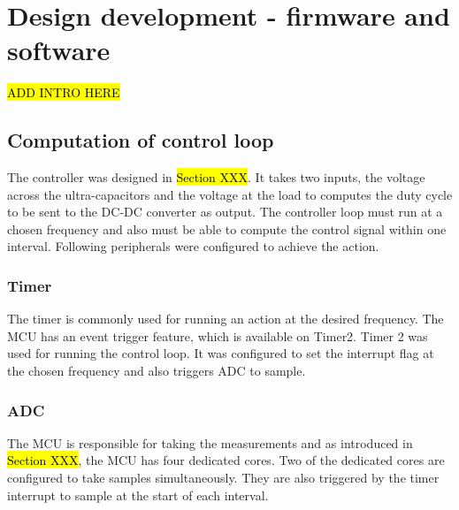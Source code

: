 \section{Design development - firmware and software}
\begin{comment}
     modules required on microcontroller for product to satisfy objectives of Section~\ref{sec:objectives}
    \begin{itemize}
        \item timer module for guaranteed execution of control loop regime at \hl{desired} frequency
        \item module to handle reading and processing of DC-DC converter circuit voltages
        \item timer module for microcontroller to transmit to user interface
        \item communication module for microcontroller to receive from user interface
    \end{itemize}
    \hl{in implementation section explain timer modules in detail (frequency, configuration etc.) (timer.c); explain UART.c; explain ADC.c; explain PWM.c; explain main.c}   
\end{comment}

\hl{ADD INTRO HERE}

\subsection{Computation of control loop}
The controller was designed in \hl{Section XXX}. It takes two inputs, the voltage across the ultra-capacitors and the voltage at the load to computes the duty cycle to be sent to the DC-DC converter as output. The controller loop must run at a chosen frequency and also must be able to compute the control signal within one interval. Following peripherals were configured to achieve the action. 

\subsubsection{Timer}
The timer is commonly used for running an action at the desired frequency. The MCU has an event trigger feature, which is available on Timer2. Timer 2 was used for running the control loop. It was configured to set the interrupt flag at the chosen frequency and also triggers ADC to sample. 

\subsubsection{ADC}
The MCU is responsible for taking the measurements and as introduced in \hl{Section XXX}, the MCU has four dedicated cores. Two of the dedicated cores are configured to take samples simultaneously. They are also triggered by the timer interrupt to sample at the start of each interval. 

